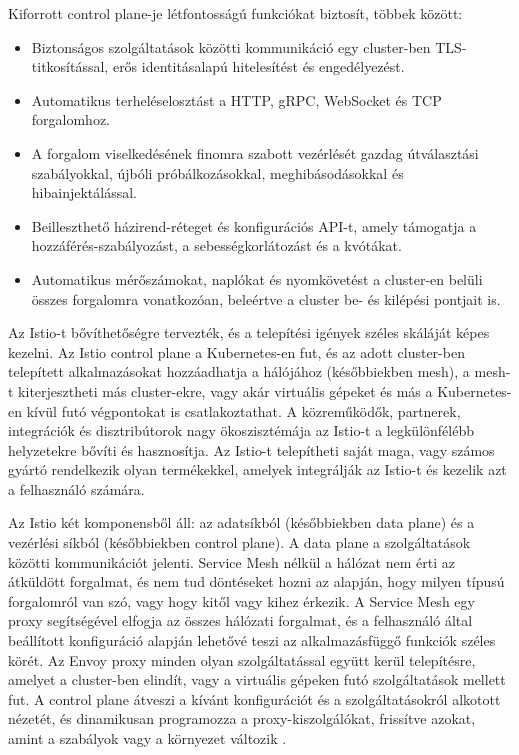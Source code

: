 \newpage

Kiforrott control plane-je létfontosságú funkciókat biztosít, többek között:

\begin{itemize}
    \item Biztonságos szolgáltatások közötti kommunikáció egy cluster-ben TLS-titkosítással, erős identitásalapú hitelesítést és engedélyezést.
    \item Automatikus terheléselosztást a HTTP, gRPC, WebSocket és TCP forgalomhoz.
    \item A forgalom viselkedésének finomra szabott vezérlését gazdag útválasztási szabályokkal, újbóli próbálkozásokkal, meghibásodásokkal és hibainjektálással.
    \item Beilleszthető házirend-réteget és konfigurációs API-t, amely támogatja a hozzáférés-szabályozást, a sebességkorlátozást és a kvótákat.
    \item Automatikus mérőszámokat, naplókat és nyomkövetést a cluster-en belüli összes forgalomra vonatkozóan, beleértve a cluster be- és kilépési pontjait is.
\end{itemize}

Az Istio-t bővíthetőségre tervezték, és a telepítési igények széles skáláját képes kezelni.
Az Istio control plane a Kubernetes-en fut, és az adott cluster-ben telepített alkalmazásokat hozzáadhatja a hálójához (későbbiekben mesh), a mesh-t kiterjesztheti más cluster-ekre, vagy akár virtuális gépeket és más a Kubernetes-en kívül futó végpontokat is csatlakoztathat.
A közreműködők, partnerek, integrációk és disztribútorok nagy ökoszisztémája az Istio-t a legkülönfélébb helyzetekre bővíti és hasznosítja.
Az Istio-t telepítheti saját maga, vagy számos gyártó rendelkezik olyan termékekkel, amelyek integrálják az Istio-t és kezelik azt a felhasználó számára.

Az Istio két komponensből áll: az adatsíkból (későbbiekben data plane) és a vezérlési síkból (későbbiekben control plane).
A data plane a szolgáltatások közötti kommunikációt jelenti.
Service Mesh nélkül a hálózat nem érti az átküldött forgalmat, és nem tud döntéseket hozni az alapján, hogy milyen típusú forgalomról van szó, vagy hogy kitől vagy kihez érkezik.
A Service Mesh egy proxy segítségével elfogja az összes hálózati forgalmat, és a felhasználó által beállított konfiguráció alapján lehetővé teszi az alkalmazásfüggő funkciók széles körét.
Az Envoy proxy minden olyan szolgáltatással együtt kerül telepítésre, amelyet a cluster-ben elindít, vagy a virtuális gépeken futó szolgáltatások mellett fut.
A control plane átveszi a kívánt konfigurációt és a szolgáltatásokról alkotott nézetét, és dinamikusan programozza a proxy-kiszolgálókat, frissítve azokat, amint a szabályok vagy a környezet változik \cite{istioSM}.

